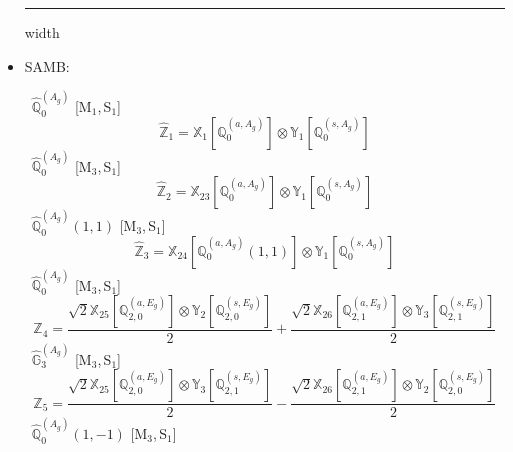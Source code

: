 \documentclass[fleqn,10pt,landscape]{article}
\begin{document}
\begin{itemize}
 \hfil \hrule height 1mm width \textwidth \hfil

\item SAMB:

\vspace{4mm}
\noindent {} $\,\,\,\hat{\mathbb{Q}}_{0}^{(A_{g})}$ [M$_{1}$,\,S$_{1}$]
\begin{dmath*}
\hat{\mathbb{Z}}_{1}=\mathbb{X}_{1}[\mathbb{Q}_{0}^{(a,A_{g})}] \otimes\mathbb{Y}_{1}[\mathbb{Q}_{0}^{(s,A_{g})}]
\end{dmath*}
\vspace{4mm}
\noindent {} $\,\,\,\hat{\mathbb{Q}}_{0}^{(A_{g})}$ [M$_{3}$,\,S$_{1}$]
\begin{dmath*}
\hat{\mathbb{Z}}_{2}=\mathbb{X}_{23}[\mathbb{Q}_{0}^{(a,A_{g})}] \otimes\mathbb{Y}_{1}[\mathbb{Q}_{0}^{(s,A_{g})}]
\end{dmath*}
\vspace{4mm}
\noindent {} $\,\,\,\hat{\mathbb{Q}}_{0}^{(A_{g})}(1,1)$ [M$_{3}$,\,S$_{1}$]
\begin{dmath*}
\hat{\mathbb{Z}}_{3}=\mathbb{X}_{24}[\mathbb{Q}_{0}^{(a,A_{g})}(1,1)] \otimes\mathbb{Y}_{1}[\mathbb{Q}_{0}^{(s,A_{g})}]
\end{dmath*}
\vspace{4mm}
\noindent {} $\,\,\,\hat{\mathbb{Q}}_{0}^{(A_{g})}$ [M$_{3}$,\,S$_{1}$]
\begin{dmath*}
\hat{\mathbb{Z}}_{4}=\frac{\sqrt{2} \mathbb{X}_{25}[\mathbb{Q}_{2,0}^{(a,E_{g})}] \otimes\mathbb{Y}_{2}[\mathbb{Q}_{2,0}^{(s,E_{g})}]}{2} + \frac{\sqrt{2} \mathbb{X}_{26}[\mathbb{Q}_{2,1}^{(a,E_{g})}] \otimes\mathbb{Y}_{3}[\mathbb{Q}_{2,1}^{(s,E_{g})}]}{2}
\end{dmath*}
\vspace{4mm}
\noindent {} $\,\,\,\hat{\mathbb{G}}_{3}^{(A_{g})}$ [M$_{3}$,\,S$_{1}$]
\begin{dmath*}
\hat{\mathbb{Z}}_{5}=\frac{\sqrt{2} \mathbb{X}_{25}[\mathbb{Q}_{2,0}^{(a,E_{g})}] \otimes\mathbb{Y}_{3}[\mathbb{Q}_{2,1}^{(s,E_{g})}]}{2} - \frac{\sqrt{2} \mathbb{X}_{26}[\mathbb{Q}_{2,1}^{(a,E_{g})}] \otimes\mathbb{Y}_{2}[\mathbb{Q}_{2,0}^{(s,E_{g})}]}{2}
\end{dmath*}
\vspace{4mm}
\noindent {} $\,\,\,\hat{\mathbb{Q}}_{0}^{(A_{g})}(1,-1)$ [M$_{3}$,\,S$_{1}$]

\end{itemize}
\end{document}
